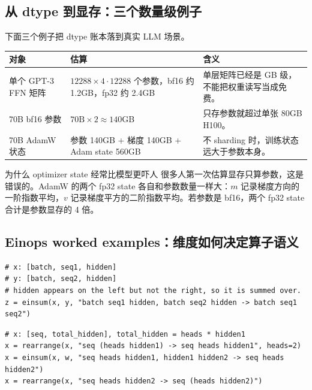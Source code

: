 \documentclass[a4paper]{article}
\begin{document}
\subsection{从 dtype 到显存：三个数量级例子}

下面三个例子把 dtype 账本落到真实 LLM 场景。

\begin{longtable}{p{}p{}p{}}
\toprule
\textbf{对象} & \textbf{估算} & \textbf{含义} \\
\midrule
单个 GPT-3 FFN 矩阵 & \(12288\times 4\cdot 12288\) 个参数，bf16 约 1.2GB，fp32 约 2.4GB & 单层矩阵已经是 GB 级，不能把权重读写当成免费。 \\
70B bf16 参数 & \(70\text{B}\times 2\approx 140\)GB & 只存参数就超过单张 80GB H100。 \\
70B AdamW 状态 & 参数 140GB + 梯度 140GB + Adam state 560GB & 不 sharding 时，训练状态远大于参数本身。 \\
\bottomrule
\end{longtable}

\begin{knowledgebox}{为什么 optimizer state 经常比模型更吓人}
很多人第一次估算显存只算参数，这是错误的。AdamW 的两个 fp32 state 各自和参数数量一样大：\(m\) 记录梯度方向的一阶指数平均，\(v\) 记录梯度平方的二阶指数平均。若参数是 bf16，两个 fp32 state 合计是参数显存的 4 倍。
\end{knowledgebox}

\subsection{Einops worked examples：维度如何决定算子语义}

\begin{lstlisting}[caption={einsum 明确说明 contracting dimension}]
# x: [batch, seq1, hidden]
# y: [batch, seq2, hidden]
# hidden appears on the left but not the right, so it is summed over.
z = einsum(x, y, "batch seq1 hidden, batch seq2 hidden -> batch seq1 seq2")
\end{lstlisting}

\begin{lstlisting}[caption={rearrange 把一个维度拆成 heads 和 hidden}]
# x: [seq, total_hidden], total_hidden = heads * hidden1
x = rearrange(x, "seq (heads hidden1) -> seq heads hidden1", heads=2)
x = einsum(x, w, "seq heads hidden1, hidden1 hidden2 -> seq heads hidden2")
x = rearrange(x, "seq heads hidden2 -> seq (heads hidden2)")
\end{lstlisting}
\end{document}
